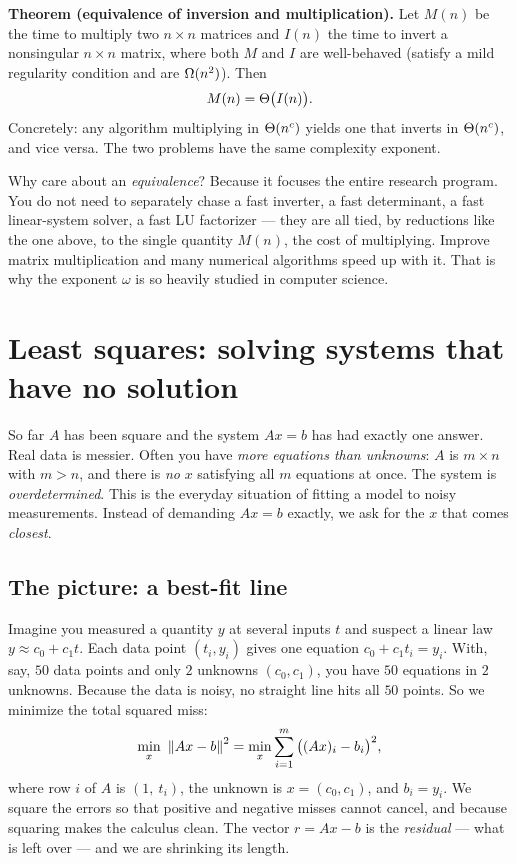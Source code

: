 \begin{formalbox}
\textbf{Theorem (equivalence of inversion and multiplication).} Let $M(n)$ be the
time to multiply two $n\times n$ matrices and $I(n)$ the time to invert a
nonsingular $n\times n$ matrix, where both $M$ and $I$ are well-behaved
(satisfy a mild regularity condition and are $\Omega(n^2)$). Then
$$
M(n)=\Theta\big(I(n)\big).
$$
Concretely: any algorithm multiplying in $\Theta(n^c)$ yields one that inverts in
$\Theta(n^c)$, and vice versa. The two problems have the same complexity exponent.
\end{formalbox}

\begin{aestheticbox}
Why care about an \emph{equivalence}? Because it focuses the entire research
program. You do not need to separately chase a fast inverter, a fast determinant,
a fast linear-system solver, a fast LU factorizer --- they are all tied, by
reductions like the one above, to the single quantity $M(n)$, the cost of
multiplying. Improve matrix multiplication and many numerical
algorithms speed up with it. That is why the exponent $\omega$ is so heavily
studied in computer science.
\end{aestheticbox}

\section{Least squares: solving systems that have no solution}

So far $A$ has been square and the system $Ax=b$ has had exactly one answer. Real
data is messier. Often you have \emph{more equations than unknowns}: $A$ is
$m\times n$ with $m>n$, and there is \emph{no} $x$ satisfying all $m$
equations at once. The system is \emph{overdetermined}. This is the everyday situation of fitting a model to noisy
measurements. Instead of demanding $Ax=b$ exactly, we ask for the $x$ that comes
\emph{closest}.

\subsection{The picture: a best-fit line}

Imagine you measured a quantity $y$ at several inputs $t$ and suspect a linear
law $y\approx c_0+c_1 t$. Each data point $(t_i,y_i)$ gives one equation
$c_0+c_1 t_i=y_i$. With, say, $50$ data points and only $2$ unknowns $(c_0,c_1)$,
you have $50$ equations in $2$ unknowns. Because the data is noisy, no straight
line hits all $50$ points. So we minimize the total squared miss:
$$
\min_{x}\ \norm{Ax-b}^2=\min_x\sum_{i=1}^{m}\big((Ax)_i-b_i\big)^2,
$$
where row $i$ of $A$ is $(1,\ t_i)$, the unknown is $x=(c_0,c_1)$, and $b_i=y_i$.
We square the errors so that positive and negative misses cannot cancel, and
because squaring makes the calculus clean. The vector $r=Ax-b$ is the
\emph{residual} --- what is left over --- and we are shrinking its length.

